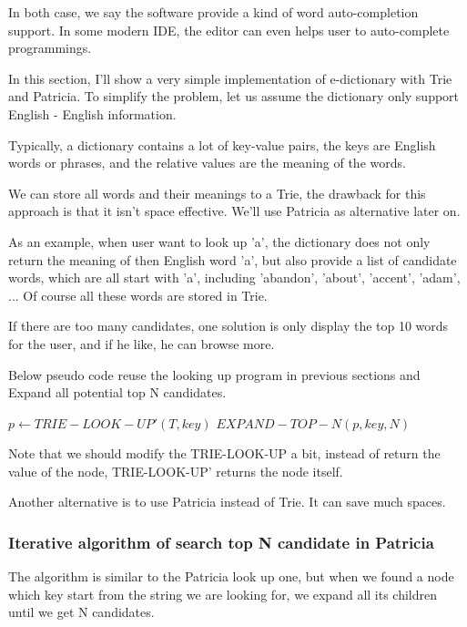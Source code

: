\documentclass{article}
\begin{document}
In both case, we say the software provide a kind of word auto-completion support.
In some modern IDE, the editor can even helps user to auto-complete programmings.

In this section, I'll show a very simple implementation of e-dictionary with Trie
and Patricia.
To simplify the problem, let us assume the dictionary only support English - English
information.

Typically, a dictionary contains a lot of key-value pairs, the keys are English
words or phrases, and the relative values are the meaning of the words.

We can store all words and their meanings to a Trie, the drawback for this
approach is that it isn't space effective. We'll use Patricia as alternative
later on.

As an example, when user want to look up 'a', the dictionary does not only
return the meaning of then English word 'a', but also provide a list of
candidate words, which are all start with 'a', including 'abandon', 'about',
'accent', 'adam', ... Of course all these words are stored in Trie.

If there are too many candidates, one solution is only display the top 10
words for the user, and if he like, he can browse more.

Below pseudo code reuse the looking up program in previous sections and
Expand all potential top N candidates.

\begin{algorithmic}[1]
  \State $p \leftarrow TRIE-LOOK-UP'(T, key)$
  \State \Return $EXPAND-TOP-N(p, key, N)$
\EndFunction
\end{algorithmic}

Note that we should modify the TRIE-LOOK-UP a bit, instead of return
the value of the node, TRIE-LOOK-UP' returns the node itself.

Another alternative is to use Patricia instead of Trie. It can save much
spaces.

\subsubsection{Iterative algorithm of search top N candidate in Patricia}

The algorithm is similar to the Patricia look up one, but when we found
a node which key start from the string we are looking for, we expand
all its children until we get N candidates.
\end{document}
